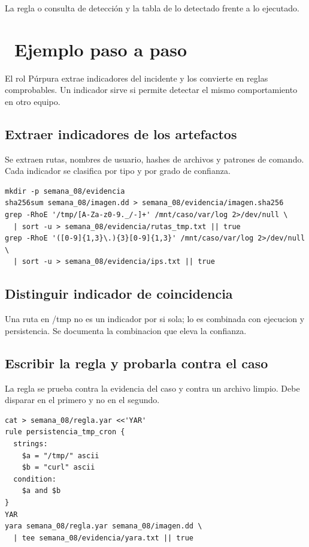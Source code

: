 \documentclass[11pt,a4paper]{article}
\newcommand{\iconotexto}[2]{\textcolor{cyanNeon}{\faIcon{#1}}~#2}
\begin{document}
La regla o consulta de detección y la tabla de lo detectado frente a lo ejecutado.

\section{\iconotexto{list-ol}{Ejemplo paso a paso}}

El rol Púrpura extrae indicadores del incidente y los convierte en reglas comprobables. Un indicador sirve si permite detectar el mismo comportamiento en otro equipo.

\subsection{Extraer indicadores de los artefactos}

Se extraen rutas, nombres de usuario, hashes de archivos y patrones de comando. Cada indicador se clasifica por tipo y por grado de confianza.

\begin{lstlisting}[style=estiloCodigo]
mkdir -p semana_08/evidencia
sha256sum semana_08/imagen.dd > semana_08/evidencia/imagen.sha256
grep -RhoE '/tmp/[A-Za-z0-9._/-]+' /mnt/caso/var/log 2>/dev/null \
  | sort -u > semana_08/evidencia/rutas_tmp.txt || true
grep -RhoE '([0-9]{1,3}\.){3}[0-9]{1,3}' /mnt/caso/var/log 2>/dev/null \
  | sort -u > semana_08/evidencia/ips.txt || true
\end{lstlisting}

\subsection{Distinguir indicador de coincidencia}

Una ruta en /tmp no es un indicador por si sola; lo es combinada con ejecucion y persistencia. Se documenta la combinacion que eleva la confianza.

\subsection{Escribir la regla y probarla contra el caso}

La regla se prueba contra la evidencia del caso y contra un archivo limpio. Debe disparar en el primero y no en el segundo.

\begin{lstlisting}[style=estiloCodigo]
cat > semana_08/regla.yar <<'YAR'
rule persistencia_tmp_cron {
  strings:
    $a = "/tmp/" ascii
    $b = "curl" ascii
  condition:
    $a and $b
}
YAR
yara semana_08/regla.yar semana_08/imagen.dd \
  | tee semana_08/evidencia/yara.txt || true
\end{lstlisting}
\end{document}
